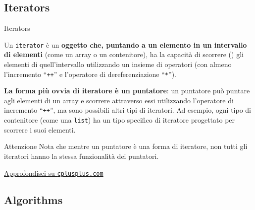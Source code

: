 \documentclass[xcolor={dvipsnames, svgnames, x11names, table}, 10pt]{beamer}
\begin{document}
\subsection{Iterators}

\begin{frame}[t]{Iterators}

Un \texttt{iterator} è un \textbf{oggetto che, puntando a un elemento in un intervallo di elementi} (come un array o un contenitore), ha la capacità di scorrere () gli elementi di quell'intervallo utilizzando un insieme di operatori (con almeno l'incremento \enquote{\texttt{+}\(\!\)\texttt{+}} e l'operatore di dereferenziazione \enquote{\texttt{*}}).

\pause

\textbf{La forma più ovvia di iteratore è un puntatore}: un puntatore può puntare agli elementi di un array e scorrere attraverso essi utilizzando l'operatore di incremento \enquote{\texttt{+}\(\!\)\texttt{+}}, ma sono possibili altri tipi di iteratori.
Ad esempio, ogni tipo di contenitore (come una \texttt{list}) ha un tipo specifico di iteratore progettato per scorrere i suoi elementi.

\pause

\begin{alertblock}{Attenzione}
Nota che mentre un puntatore è una forma di iteratore, non tutti gli iteratori hanno la stessa funzionalità dei puntatori.
\end{alertblock}

\href{https://www.cplusplus.com/reference/iterator/}{Approfondisci su \texttt{cplusplus.com} \ExternalLink}

\end{frame}

\subsection{Algorithms}
\end{document}
